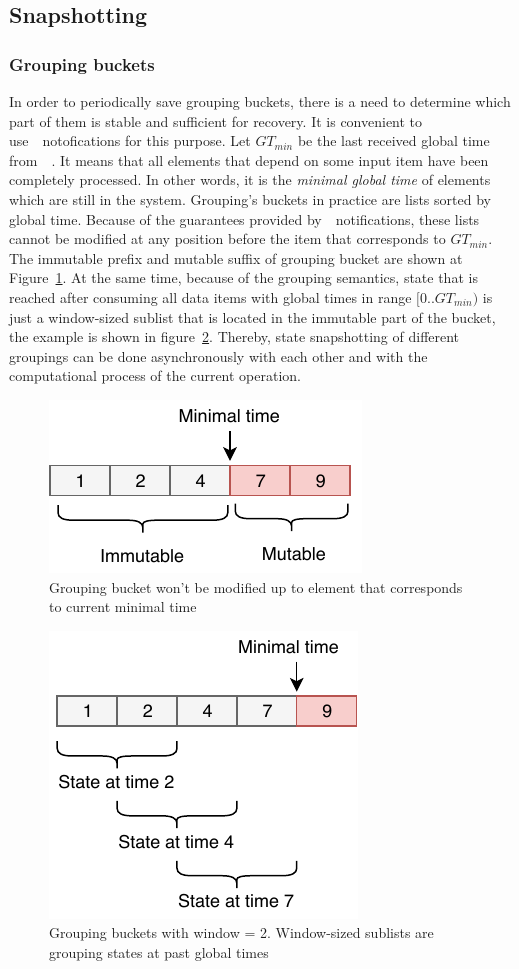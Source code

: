 \subsection{Snapshotting}

\subsubsection{Grouping buckets}

In order to periodically save grouping buckets, there is a need to determine which part of them is stable and sufficient for recovery. It is convenient to use~\Acker\ notofications for this purpose. Let $GT_{min}$ be the last received global time from~\Acker\ . It means that all elements that depend on some input item have been completely processed. In other words, it is the {\em minimal global time} of elements which are still in the system.  Grouping's buckets in practice are lists sorted by global time. Because of the guarantees provided by~\Acker\ notifications, these lists cannot be modified at any position before the item that corresponds to $GT_{min}$. The immutable prefix and mutable suffix of grouping bucket are shown at Figure~\ref{immutable}. At the same time, because of the grouping semantics, state that is reached after consuming all data items with global times in range $[0..GT_{min})$ is just a window-sized sublist that is located in the immutable part of the bucket, the example is shown in figure~\ref{substate}. Thereby, state snapshotting of different groupings can be done asynchronously with each other and with the computational process of the current operation. 

\begin{figure}[htbp]
  \centering
  \includegraphics[width=.3\textwidth]{pics/immutable}
  \caption{Grouping bucket won't be modified up to element that corresponds to current minimal time}
  \label {immutable}
\end{figure}

\begin{figure}[htbp]
  \centering
  \includegraphics[width=.3\textwidth]{pics/substate}
  \caption{Grouping buckets with window = 2. Window-sized sublists are grouping states at past global times}
  \label {substate}
\end{figure}

